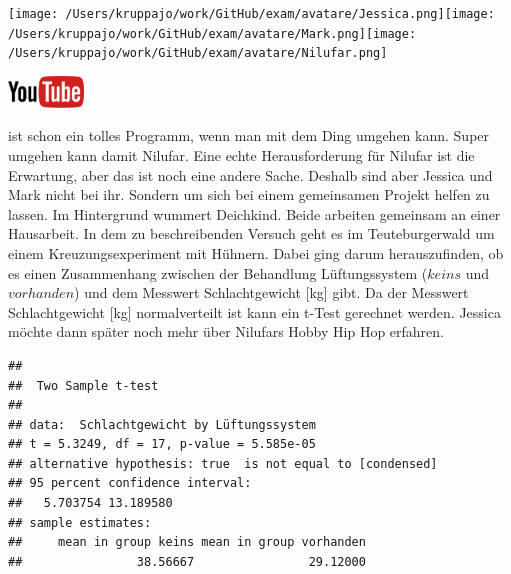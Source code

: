 \documentclass[a4paper, 9pt]{scrartcl}\usepackage[]{graphicx}\usepackage[]{xcolor}
\makeatletter
\newenvironment{kframe}{%
 \def\at@end@of@kframe{}%
 \ifinner\ifhmode%
  \def\at@end@of@kframe{\end{minipage}}%
  \begin{minipage}{\columnwidth}%
 \fi\fi%
 \def\FrameCommand##1{\hskip\@totalleftmargin \hskip-\fboxsep
 \colorbox{shadecolor}{##1}\hskip-\fboxsep
     \hskip-\linewidth \hskip-\@totalleftmargin \hskip\columnwidth}%
 \MakeFramed {\advance\hsize-\width
   \@totalleftmargin\z@ \linewidth\hsize
   \@setminipage}}%
 {\par\unskip\endMakeFramed%
 \at@end@of@kframe}
\newenvironment{knitrout}{}{} %
\makeatother
\begin{document}
 
\begin{minipage}[t]{0.5\textwidth}
\texttt{[image: /Users/kruppajo/work/GitHub/exam/avatare/Jessica.png]}\hspace{-4mm}\texttt{[image: /Users/kruppajo/work/GitHub/exam/avatare/Mark.png]}\hspace{-4mm}\texttt{[image: /Users/kruppajo/work/GitHub/exam/avatare/Nilufar.png]}
\end{minipage}
\begin{minipage}[t]{0.5\textwidth}
\hfill
\href{https://youtu.be/wJqsNV1hOW8}{\includegraphics[width = 2cm]{img/youtube}}
\end{minipage}
\vspace{1ex}



\Rlogo ist schon ein tolles Programm, wenn man mit dem Ding umgehen kann. Super umgehen kann damit Nilufar. Eine echte Herausforderung für Nilufar ist die Erwartung, aber das ist noch eine andere Sache. Deshalb sind aber Jessica und Mark nicht bei ihr. Sondern um sich bei einem gemeinsamen Projekt helfen zu lassen. Im Hintergrund wummert Deichkind. Beide arbeiten gemeinsam an einer Hausarbeit. In dem zu beschreibenden Versuch geht es im Teuteburgerwald um einem Kreuzungsexperiment mit Hühnern. Dabei ging darum herauszufinden, ob es einen Zusammenhang zwischen der Behandlung Lüftungssystem ($keins$ und $vorhanden$) und dem Messwert Schlachtgewicht [kg] gibt. Da der Messwert Schlachtgewicht [kg] normalverteilt ist kann ein t-Test gerechnet werden. Jessica möchte dann später noch mehr über Nilufars Hobby Hip Hop erfahren.

\begin{knitrout}
\color{fgcolor}\begin{kframe}
\begin{verbatim}
## 
## 	Two Sample t-test
## 
## data:  Schlachtgewicht by Lüftungssystem
## t = 5.3249, df = 17, p-value = 5.585e-05
## alternative hypothesis: true  is not equal to [condensed]
## 95 percent confidence interval:
##   5.703754 13.189580
## sample estimates:
##     mean in group keins mean in group vorhanden 
##                38.56667                29.12000
\end{verbatim}
\end{kframe}
\end{knitrout}
\end{document}
